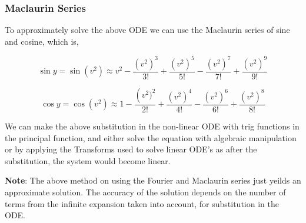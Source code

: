 	\subsubsection{{Maclaurin Series}}

		{To approximately solve the above ODE we can use the Maclaurin series of sine and cosine, which is,}

			$$\sin y = \sin\left(v^2\right) \approx v^2 - \frac{\left(v^2\right)^3}{3!} + \frac{\left(v^2\right)^5}{5!} - \frac{\left(v^2\right)^7}{7!} + \frac{\left(v^2\right)^9}{9!}$$

		$$\cos y = \cos\left(v^2\right) \approx 1 - \frac{\left(v^2)^2}{2!} + \frac{\left(v^2\right)^4}{4!} - \frac{\left(v^2\right)^6}{6!} + \frac{\left(v^2\right)^8}{8!}$$

		{We can make the above substitution in the non-linear ODE with trig functions in the principal function, and either solve the equation with algebraic manipulation or by applying the Transforms used to solve linear ODE's as after the substitution, the system would become linear.}

		{\textbf{Note}: The above method on using the Fourier and Maclaurin series just yeilds an approximate solution. The accuracy of the solution depends on the number of terms from the infinite expansion taken into account, for substitution in the ODE.}


